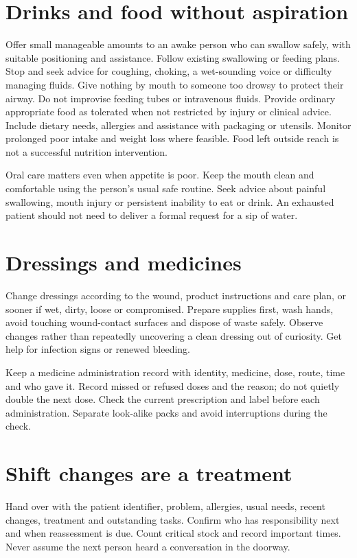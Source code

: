 \documentclass[10pt,openright]{book}
\begin{document}
\section*{Drinks and food without aspiration}
Offer small manageable amounts to an awake person who can swallow safely, with suitable positioning and assistance. Follow existing swallowing or feeding plans. Stop and seek advice for coughing, choking, a wet-sounding voice or difficulty managing fluids. Give nothing by mouth to someone too drowsy to protect their airway. Do not improvise feeding tubes or intravenous fluids. Provide ordinary appropriate food as tolerated when not restricted by injury or clinical advice. Include dietary needs, allergies and assistance with packaging or utensils. Monitor prolonged poor intake and weight loss where feasible. Food left outside reach is not a successful nutrition intervention.

Oral care matters even when appetite is poor. Keep the mouth clean and comfortable using the person's usual safe routine. Seek advice about painful swallowing, mouth injury or persistent inability to eat or drink. An exhausted patient should not need to deliver a formal request for a sip of water.

\section*{Dressings and medicines}
Change dressings according to the wound, product instructions and care plan, or sooner if wet, dirty, loose or compromised. Prepare supplies first, wash hands, avoid touching wound-contact surfaces and dispose of waste safely. Observe changes rather than repeatedly uncovering a clean dressing out of curiosity. Get help for infection signs or renewed bleeding.

Keep a medicine administration record with identity, medicine, dose, route, time and who gave it. Record missed or refused doses and the reason; do not quietly double the next dose. Check the current prescription and label before each administration. Separate look-alike packs and avoid interruptions during the check.

\section*{Shift changes are a treatment}
Hand over with the patient identifier, problem, allergies, usual needs, recent changes, treatment and outstanding tasks. Confirm who has responsibility next and when reassessment is due. Count critical stock and record important times. Never assume the next person heard a conversation in the doorway.
\end{document}
